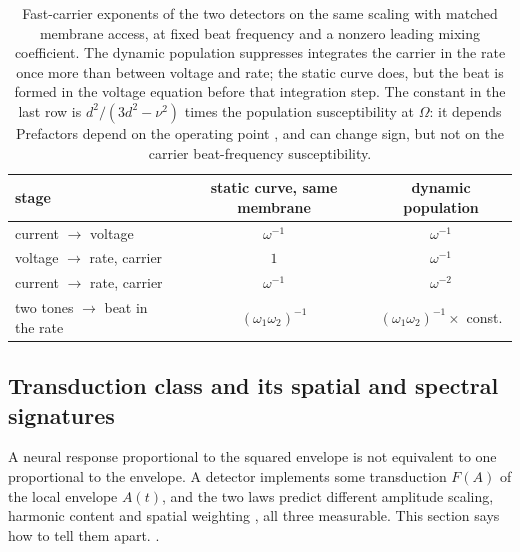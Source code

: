 \documentclass[11pt,a4paper]{article}
\providecommand{\DIFaddtex}[1]{{\protect\color{blue} \sf #1}} %
\providecommand{\DIFdeltex}[1]{{\protect\color{red} \scriptsize #1}} %
\providecommand{\DIFaddbegin}{} %
\providecommand{\DIFaddend}{} %
\providecommand{\DIFdelbegin}{} %
\providecommand{\DIFdelend}{} %
\providecommand{\DIFaddFL}[1]{\DIFadd{#1}} %
\providecommand{\DIFdelFL}[1]{\DIFdel{#1}} %
\providecommand{\DIFaddbeginFL}{} %
\providecommand{\DIFaddendFL}{} %
\providecommand{\DIFdelbeginFL}{} %
\providecommand{\DIFdelendFL}{} %
\providecommand{\DIFadd}[1]{\texorpdfstring{\DIFaddtex{#1}}{#1}} %
\providecommand{\DIFdel}[1]{\texorpdfstring{\DIFdeltex{#1}}{}} %
\begin{document}
\begin{table}[h]
\centering\small
\begin{tabular}{lcc}
\toprule
stage & static curve, same membrane & dynamic population \\
\midrule
current $\to$ voltage & $\omega^{-1}$ & $\omega^{-1}$ \\
voltage $\to$ rate, carrier & $1$ & $\omega^{-1}$ \\
current $\to$ rate, carrier & $\omega^{-1}$ & $\omega^{-2}$ \\
two tones $\to$ beat in the rate & $(\omega_1\omega_2)^{-1}$ & $(\omega_1\omega_2)^{-1}\times$ const. \\
\bottomrule
\end{tabular}
\caption{Fast-carrier \DIFdelbeginFL \DIFdelFL{exponents of the two detectors on the same }\DIFdelendFL \DIFaddbeginFL \DIFaddFL{scaling with matched }\DIFaddendFL membrane \DIFaddbeginFL \DIFaddFL{access, at fixed beat frequency
and a nonzero leading mixing coefficient}\DIFaddendFL . The dynamic population \DIFdelbeginFL \DIFdelFL{suppresses }\DIFdelendFL \DIFaddbeginFL \DIFaddFL{integrates }\DIFaddendFL the
carrier \DIFdelbeginFL \DIFdelFL{in the rate }\DIFdelendFL once more \DIFdelbeginFL \DIFdelFL{than }\DIFdelendFL \DIFaddbeginFL \DIFaddFL{between voltage and rate; }\DIFaddendFL the \DIFdelbeginFL \DIFdelFL{static curve does, but the }\DIFdelendFL beat is formed \DIFdelbeginFL \DIFdelFL{in the voltage equation }\DIFdelendFL before that \DIFdelbeginFL \DIFdelFL{integration}\DIFdelendFL \DIFaddbeginFL \DIFaddFL{step}\DIFaddendFL .
\DIFdelbeginFL \DIFdelFL{The constant in the last row is
$d^2/(3d^2-\nu^2)$ times the population susceptibility at $\Omega$: it depends }\DIFdelendFL \DIFaddbeginFL \DIFaddFL{Prefactors depend }\DIFaddendFL on the operating point \DIFdelbeginFL \DIFdelFL{, }\DIFdelendFL and \DIFdelbeginFL \DIFdelFL{can change sign, but not on the carrier}\DIFdelendFL \DIFaddbeginFL \DIFaddFL{beat-frequency susceptibility}\DIFaddendFL .}
\label{tab:exponents}
\end{table}

\subsection{Transduction class and its spatial and spectral signatures}\label{sec:transduction}
A neural response proportional to the squared envelope is not equivalent to one
proportional to the envelope. A detector implements some transduction $F(A)$ of the local
envelope $A(t)$, and the two laws predict different amplitude scaling, harmonic content and
spatial weighting\DIFdelbegin \DIFdel{, all three measurable.
This section says how to tell them apart.
}\DIFdelend \DIFaddbegin \DIFadd{.
}\DIFaddend
\end{document}

